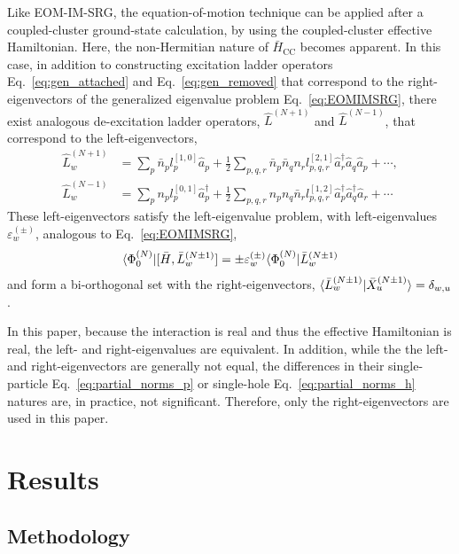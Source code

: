 Like EOM-IM-SRG, the equation-of-motion technique can be applied after
a coupled-cluster ground-state calculation, by using the
coupled-cluster effective Hamiltonian.  Here, the non-Hermitian nature
of $\bar{H}_{\mathrm{CC}}$ becomes apparent.  In this case, in
addition to constructing excitation ladder operators
Eq.~\eqref{eq:gen_attached} and Eq.~\eqref{eq:gen_removed} that
correspond to the right-eigenvectors of the generalized eigenvalue
problem Eq.~\eqref{eq:EOMIMSRG}, there exist analogous de-excitation
ladder operators, $\hat{L}^{(N+1)}$ and $\hat{L}^{(N-1)}$, that
correspond to the left-eigenvectors,
\begin{align*}
    \hat{L}^{(N+1)}_w &= \sum_p \bar{n}_p l^{[1,0]}_p \hat{a}_p + \frac{1}{2} \sum_{p, q, r} \bar{n}_p \bar{n}_q n_r l^{[2,1]}_{p, q, r} \hat{a}^\dagger_r \hat{a}_q \hat{a}_p + \cdots, \\
    \hat{L}^{(N-1)}_w &= \sum_p n_p l_p^{[0,1]} \hat{a}^\dagger_p + \frac{1}{2} \sum_{p, q, r} n_p n_q \bar{n}_r  l^{[1,2]}_{p, q, r} \hat{a}^\dagger_p  \hat{a}^\dagger_q \hat{a}_r + \cdots
\end{align*}
These left-eigenvectors satisfy the left-eigenvalue problem, with
left-eigenvalues $\varepsilon^{(\pm)}_w$, analogous to
Eq.~\eqref{eq:EOMIMSRG},
\begin{align*}
  \langle \Phi^{(N)}_0 | [\bar{H},\bar{L}^{(N \pm 1)}_w] = \pm \varepsilon^{(\pm)}_w \langle \Phi^{(N)}_0 | \bar{L}^{(N \pm 1)}_w
\end{align*}
and form a bi-orthogonal set with the right-eigenvectors, $\langle \bar{L}^{(N \pm 1)}_w | \bar{X}^{(N \pm 1)}_u\rangle = \delta_{w,u}$.

In this paper, because the interaction is real and thus the effective
Hamiltonian is real, the left- and right-eigenvalues are
equivalent. In addition, while the the left- and right-eigenvectors
are generally not equal, the differences in their single-particle
Eq.~\eqref{eq:partial_norms_p} or single-hole
Eq.~\eqref{eq:partial_norms_h} natures are, in practice, not
significant.  Therefore, only the right-eigenvectors are used in this
paper.

\section{Results}
\label{sec:results}

\subsection{Methodology}
\label{subsec:methodology}

